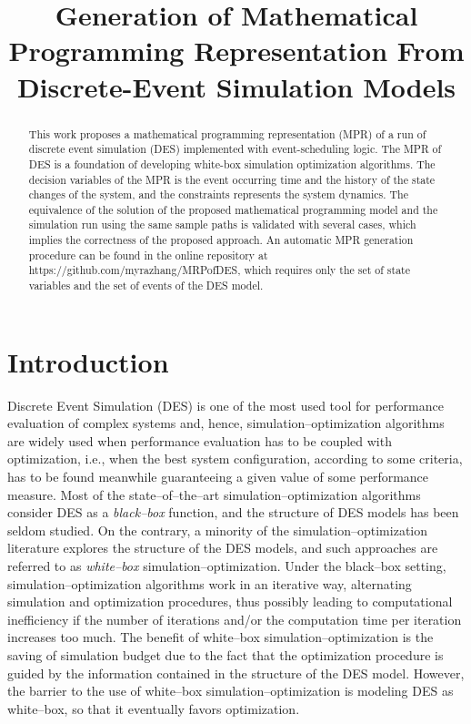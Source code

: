 \documentclass[]{interact}
\theoremstyle{plain}%
\theoremstyle{definition}
\theoremstyle{remark}
\begin{document}

\title{Generation of Mathematical Programming Representation From Discrete-Event Simulation Models}
\maketitle
\begin{abstract}
This work proposes a mathematical programming representation (MPR) of a run of discrete event simulation (DES) implemented with event-scheduling logic. The MPR of DES is a foundation of developing white-box simulation optimization algorithms. The decision variables of the MPR is the event occurring time and the history of the state changes of the system, and the constraints represents the system dynamics. The equivalence of the solution of the proposed mathematical programming model and the simulation run using the same sample paths is validated with several cases, which implies the correctness of the proposed approach. An automatic MPR generation procedure can be found in the online repository at https://github.com/myrazhang/MRPofDES, which requires only the set of state variables and the set of events of the DES model.
\end{abstract}

\section{Introduction}
Discrete Event Simulation (DES) is one of the most used tool for performance evaluation of %
complex systems and, hence, simulation--optimization algorithms are widely used %
when performance evaluation has to be coupled with optimization, i.e., when the best system configuration, according to some criteria, has to be found meanwhile guaranteeing a given value of some performance measure.  
Most of the state--of--the--art simulation--optimization algorithms consider DES as a \textit{black--box} function, and the structure of DES models has been seldom studied. On the contrary, a minority of the simulation--optimization literature explores the structure of the DES models, and %
such approaches are referred to as \textit{white--box} simulation--optimization. 
Under the black--box setting, simulation--optimization algorithms work in an iterative way, alternating simulation and optimization procedures, 
thus possibly leading to computational inefficiency if the number of iterations and/or the computation time per iteration increases too much. 
The benefit of white--box simulation--optimization is the saving of simulation budget due to the fact that %
the optimization procedure is guided by the information contained in the structure of the DES model. However, the barrier to the use of white--box simulation--optimization is modeling DES as white--box, so that it eventually favors optimization. 
\end{document}
